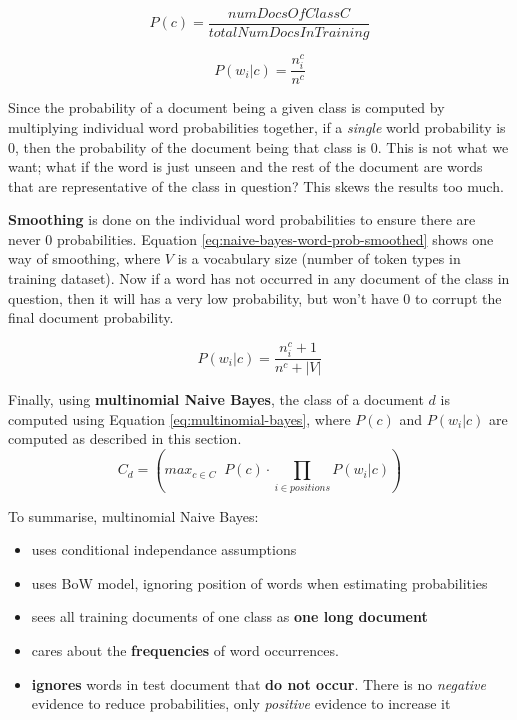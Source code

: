 \documentclass{article}
\begin{document}
\begin{equation}
	P(c) = \frac{numDocsOfClassC}{totalNumDocsInTraining}
	\label{eq:naive-bayes-class-prob}
\end{equation}

\begin{equation}
	P(w_i|c) = \frac{n_i^c}{n^c}
	\label{eq:naive-bayes-word-prob}
\end{equation}

Since the probability of a document being a given class is computed by multiplying individual word probabilities together, if a \textit{single} world probability is 0, then the probability of the document being that class is 0. This is not what we want; what if the word is just unseen and the rest of the document are words that are representative of the class in question? This skews the results too much.

\textbf{Smoothing} is done on the individual word probabilities to ensure there are never 0 probabilities. Equation \ref{eq:naive-bayes-word-prob-smoothed} shows one way of smoothing, where $V$ is a vocabulary size (number of token types in training dataset). Now if a word has not occurred in any document of the class in question, then it will has a very low probability, but won't have 0 to corrupt the final document probability.

\begin{equation}
	P(w_i|c) = \frac{n_i^c + 1}{n^c + |V|}
	\label{eq:naive-bayes-word-prob-smoothed}
\end{equation}

Finally, using \textbf{multinomial Naive Bayes}, the class of a document $d$ is computed using Equation \ref{eq:multinomial-bayes}, where $P(c)$ and $P(w_i|c)$ are computed as described in this section.
\begin{equation}
	C_{d} = \left( max_{c \in C} \;\; P(c) \cdot \prod_{i \in positions} P(w_i|c) \right)
	\label{eq:multinomial-bayes}
\end{equation}

To summarise, multinomial Naive Bayes:
\begin{itemize}
	\item uses conditional independance assumptions
	\item uses BoW model, ignoring position of words when estimating probabilities 
	\item sees all training documents of one class as \textbf{one long document}
	\item cares about the \textbf{frequencies} of word occurrences.
	\item \textbf{ignores} words in test document that \textbf{do not occur}. There is no \textit{negative} evidence to reduce probabilities, only \textit{positive} evidence to increase it
\end{itemize}
\end{document}
